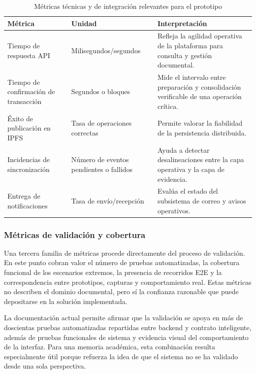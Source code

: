 \documentclass[11pt, a4paper]{article}
\begin{document}
\begin{table}[H]
    \centering
    \small
    \begin{tabular}{|p{4cm}|p{3.5cm}|p{5.9cm}|}
    \hline
    \textbf{Métrica} & \textbf{Unidad} & \textbf{Interpretación} \\
    \hline
    Tiempo de respuesta API & Milisegundos/segundos & Refleja la agilidad operativa de la plataforma para consulta y gestión documental. \\
    \hline
    Tiempo de confirmación de transacción & Segundos o bloques & Mide el intervalo entre preparación y consolidación verificable de una operación crítica. \\
    \hline
    Éxito de publicación en IPFS & Tasa de operaciones correctas & Permite valorar la fiabilidad de la persistencia distribuida. \\
    \hline
    Incidencias de sincronización & Número de eventos pendientes o fallidos & Ayuda a detectar desalineaciones entre la capa operativa y la capa de evidencia. \\
    \hline
    Entrega de notificaciones & Tasa de envío/recepción & Evalúa el estado del subsistema de correo y avisos operativos. \\
    \hline
    \end{tabular}
    \caption{Métricas técnicas y de integración relevantes para el prototipo}
    \label{tab:metricas-tecnicas-memoria}
\end{table}

\subsubsection{Métricas de validación y cobertura}

Una tercera familia de métricas procede directamente del proceso de validación. En este punto cobran valor el número de pruebas automatizadas, la cobertura funcional de los escenarios extremos, la presencia de recorridos E2E y la correspondencia entre prototipos, capturas y comportamiento real. Estas métricas no describen el dominio documental, pero sí la confianza razonable que puede depositarse en la solución implementada.

La documentación actual permite afirmar que la validación se apoya en más de doscientas pruebas automatizadas repartidas entre backend y contrato inteligente, además de pruebas funcionales de sistema y evidencia visual del comportamiento de la interfaz. Para una memoria académica, esta combinación resulta especialmente útil porque refuerza la idea de que el sistema no se ha validado desde una sola perspectiva.
\end{document}
